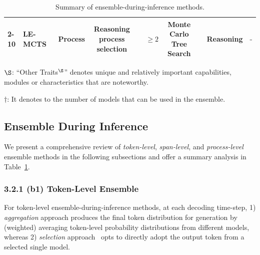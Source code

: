 \documentclass{article}
\newcommand{\xmark}{\ding{55}}%
\begin{document}
\begin{table}[t]
{\begin{threeparttable}
{\begin{tabular}{llcc c c c c c c }
\cmidrule{2-10} 
\multirow{1}{*}{(b3)}
&
 LE-MCTS~\cite{park2024ensembling} & Process  &  Reasoning process selection  & \xmark  & $\geq 2$  &  Monte Carlo Tree 
Search &  \xmark  & Reasoning & \textcolor{gray}{-} \\
\bottomrule
\end{tabular}
}
\begin{tablenotes}
\small
\item[1] $\S$: 
``Other Traits$^{\S}$'' denotes
unique and relatively important capabilities, modules or characteristics that are noteworthy.
\item[2] $\dag$:  It denotes to the number of models that can be used in the ensemble.
\end{tablenotes}
\end{threeparttable} 
}
\smallskip
\hfil
\captionsetup{type=table,skip=5pt}
  \caption{Summary of ensemble-during-inference methods.}
    \label{tab:Ensemble-during-inference}
\end{table}














\subsection{Ensemble During Inference}
\label{Ensemble-during-inference}



We present a comprehensive review of \textit{token-level}, \textit{span-level}, and \textit{process-level} ensemble methods in the following subsections and offer a summary analysis in Table~\ref{tab:Ensemble-during-inference}.


\subsubsection{3.2.1 (b1) Token-Level Ensemble}
\label{Token-level Ensemble}


For token-level ensemble-during-inference methods, at each decoding time-step, 1) \textit{aggregation} approach \cite{yu2024breaking,huang2024ensemble,xu2024bridging,yao2024determine,mavromatis2024pack,jin2024collaborative} produces the final token distribution for generation by (weighted) averaging token-level probability distributions from different models, whereas 2) \textit{selection} 
approach~\cite{park2024ensembling} opts to directly adopt the output token from a selected single model.
\end{document}
